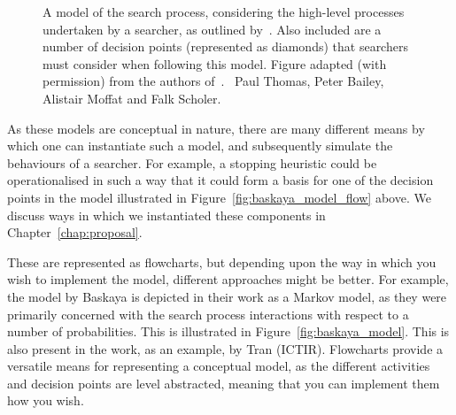 \begin{figure}[t!]
    \centering
    \caption[Model of the search process by~\cite{thomas2014modelling_behaviour}]{A model of the search process, considering the high-level processes undertaken by a searcher, as outlined by~\cite{thomas2014modelling_behaviour}. Also included are a number of decision points (represented as diamonds) that searchers must consider when following this model. Figure adapted (with permission) from the authors of~\citealt{thomas2014modelling_behaviour}. \textcopyright~Paul Thomas, Peter Bailey, Alistair Moffat and Falk Scholer.}
    \label{fig:thomas_model}
\end{figure}

 As these models are conceptual in nature, there are many different means by which one can instantiate such a model, and subsequently simulate the behaviours of a searcher. For example, a stopping heuristic could be operationalised in such a way that it could form a basis for one of the decision points in the model illustrated in Figure~\ref{fig:baskaya_model_flow} above. We discuss ways in which we instantiated these components in Chapter~\ref{chap:proposal}.

\noindent
{} These are represented as flowcharts, but depending upon the way in which you wish to implement the model, different approaches might be better. For example, the model by Baskaya is depicted in their work as a Markov model, as they were primarily concerned with the search process interactions with respect to a number of probabilities. This is illustrated in Figure~\ref{fig:baskaya_model}. This is also present in the work, as an example, by Tran (ICTIR). Flowcharts provide a versatile means for representing a conceptual model, as the different activities and decision points are level abstracted, meaning that you can implement them how you wish.

